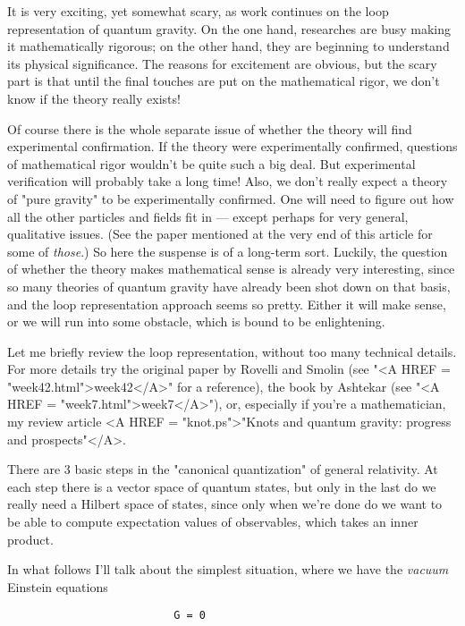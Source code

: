 

It is very exciting, yet somewhat scary, as work continues on the loop
representation of quantum gravity.  On the one hand, researches are busy
making it mathematically rigorous; on the other hand, they are beginning
to understand its physical significance.  The reasons for excitement are
obvious, but the scary part is that until the final touches are put on
the mathematical rigor, we don't know if the theory really exists!

Of course there is the whole separate issue of whether the theory will
find experimental confirmation.  If the theory were experimentally
confirmed, questions of mathematical rigor wouldn't be quite such a big
deal.  But experimental verification will probably take a long time!
Also, we don't really expect a theory of "pure gravity" to be
experimentally confirmed.  One will need to figure out how all the other
particles and fields fit in --- except perhaps for very general,
qualitative issues.  (See the paper mentioned at the very end of this
article for some of \emph{those}.)  So here the suspense is of a long-term
sort.  Luckily, the question of whether the theory makes mathematical
sense is already very interesting, since so many theories of quantum
gravity have already been shot down on that basis, and the loop
representation approach seems so pretty.  Either it will make sense, or
we will run into some obstacle, which is bound to be enlightening.

Let me briefly review the loop representation, without too many
technical details.  For more details try the original paper by Rovelli
and Smolin (see "<A HREF = "week42.html">week42</A>" for a reference), the book by Ashtekar (see
"<A HREF = "week7.html">week7</A>"), or, especially if you're a mathematician, 
my review article <A HREF = "knot.ps">"Knots and quantum gravity: progress and prospects"</A>.

There are 3 basic steps in the "canonical quantization" of general
relativity.  At each step there is a vector space of quantum states, but
only in the last do we really need a Hilbert space of states, since only
when we're done do we want to be able to compute expectation values of
observables, which takes an inner product.  

In what follows I'll talk about the simplest situation, where we have
the \emph{vacuum} Einstein equations 

\begin{verbatim}
                          G = 0
\end{verbatim}
    

